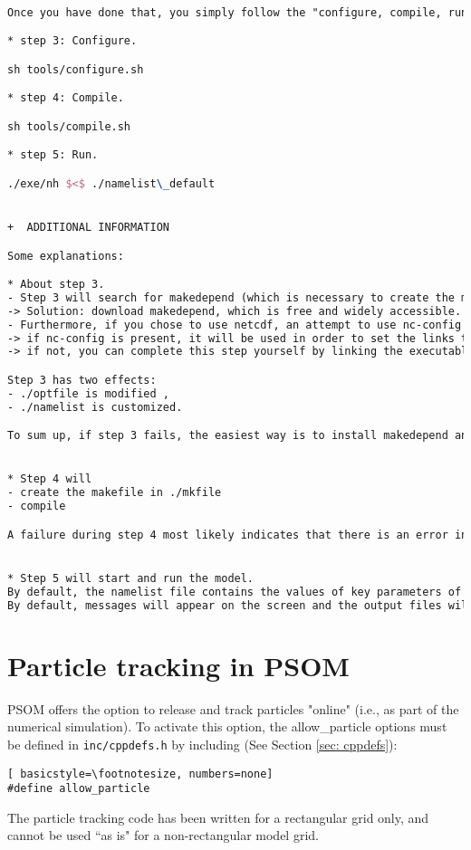 \documentclass[12pt,letterpaper,titlepage]{article}
\begin{document}
\begin{lstlisting}[language=TeX, breaklines]

Once you have done that, you simply follow the "configure, compile, run" sequence:

* step 3: Configure.

sh tools/configure.sh

* step 4: Compile.

sh tools/compile.sh

* step 5: Run.

./exe/nh $<$ ./namelist\_default


+  ADDITIONAL INFORMATION

Some explanations:

* About step 3.
- Step 3 will search for makedepend (which is necessary to create the makefile). The script will stop if makedepend is not installed. The makefile file will only be created if makedepend can be called.
-> Solution: download makedepend, which is free and widely accessible. For instance, on mac, you can simply sudo port install makedepend (if you have macport installed). 
- Furthermore, if you chose to use netcdf, an attempt to use nc-config will be tried. Note that the code has only been tested with netcdf4 libraries.
-> if nc-config is present, it will be used in order to set the links to netcdf libraries appropriately.
-> if not, you can complete this step yourself by linking the executable to the netcdf libraries. To do so, edit ./optfile before going through step 3.

Step 3 has two effects:
- ./optfile is modified ,
- ./namelist is customized.

To sum up, if step 3 fails, the easiest way is to install makedepend and/or to install netcdf libraries (in case you want to use netcdf output). After having done that, repeat step 3. 


* Step 4 will 
- create the makefile in ./mkfile
- compile

A failure during step 4 most likely indicates that there is an error in the fortran code.


* Step 5 will start and run the model.
By default, the namelist file contains the values of key parameters of the model, that you are likely willing to change. You can of course edit namelist to your convenience and repeat step 5.
By default, messages will appear on the screen and the output files will go to ../output/.
\end{lstlisting}

\section{Particle tracking in PSOM}
PSOM offers the option to release and track particles "online" (i.e., as part of the numerical simulation). To activate this option, the allow\_particle options must be defined in \texttt{inc/cppdefs.h} by including (See Section \ref{sec: cppdefs}):
\begin{lstlisting}[	basicstyle=\footnotesize, numbers=none]
#define allow_particle
\end{lstlisting}
The particle tracking code has been written for a rectangular grid only, and cannot be used ``as is" for a non-rectangular model grid.
\end{document}
